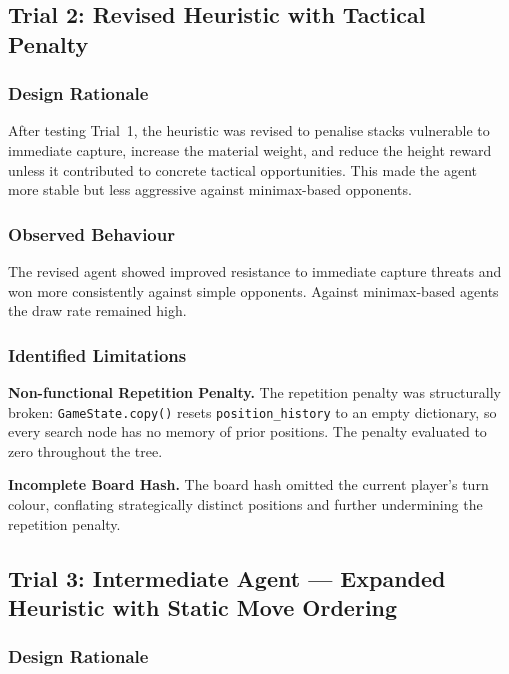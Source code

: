 \documentclass[10pt,a4paper]{article}
\begin{document}
\subsection{Trial 2: Revised Heuristic with Tactical Penalty}

\subsubsection{Design Rationale}

After testing Trial~1, the heuristic was revised to penalise stacks vulnerable to immediate capture, increase the material weight, and reduce the height reward unless it contributed to concrete tactical opportunities. This made the agent more stable but less aggressive against minimax-based opponents.

\subsubsection{Observed Behaviour}

The revised agent showed improved resistance to immediate capture threats and won more consistently against simple opponents. Against minimax-based agents the draw rate remained high.

\subsubsection{Identified Limitations}

\textbf{Non-functional Repetition Penalty.}
The repetition penalty was structurally broken: \texttt{GameState.copy()} resets \texttt{position\_history} to an empty dictionary, so every search node has no memory of prior positions. The penalty evaluated to zero throughout the tree.

\textbf{Incomplete Board Hash.}
The board hash omitted the current player's turn colour, conflating strategically distinct positions and further undermining the repetition penalty.

\subsection{Trial 3: Intermediate Agent --- Expanded Heuristic with Static Move Ordering}

\subsubsection{Design Rationale}
\end{document}
